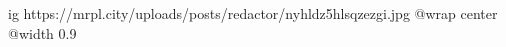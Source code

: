  
 
 
 
 

\ifcmt
  ig https://mrpl.city/uploads/posts/redactor/nyhldz5hlsqzezgi.jpg
  @wrap center
  @width 0.9
\fi
